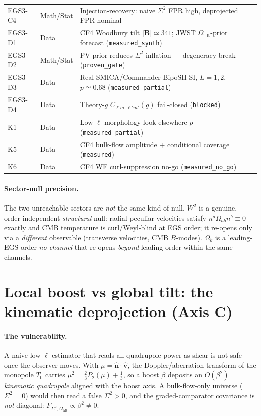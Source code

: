 \documentclass[11pt]{article}
\newcommand{\code}[1]{\texttt{\small #1}}
\newcommand{\Sig}{\Sigma^2}
\newcommand{\Wsq}{W^2}
\newcommand{\Otilt}{\Omega_{\mathrm{tilt}}}
\newcommand{\Ok}{\Omega_{k}}
\begin{document}
\begin{longtable}{@{}lll@{}}
EGS3-C4 & Math/Stat & Injection-recovery: naive $\Sig$ FPR high, deprojected FPR nominal \\
EGS3-D1 & Data & CF4 Woodbury tilt $|\mathbf B|\!\simeq\!341$; JWST $\Otilt$-prior forecast (\code{measured\_synth}) \\
EGS3-D2 & Math/Stat & PV prior reduces $\Sig$ inflation --- degeneracy break (\code{proven\_gate}) \\
EGS3-D3 & Data & Real SMICA/Commander BipoSH SI, $L{=}1,2$, $p\!\simeq\!0.68$ (\code{measured\_partial}) \\
EGS3-D4 & Data & Theory-$g$ $C_{\ell m,\ell'm'}(g)$ fail-closed (\code{blocked}) \\
\midrule
K1 & Data & Low-$\ell$ morphology look-elsewhere $p$ (\code{measured\_partial}) \\
K5 & Data & CF4 bulk-flow amplitude $+$ conditional coverage (\code{measured}) \\
K6 & Data & CF4 WF curl-suppression no-go (\code{measured\_no\_go}) \\
\bottomrule
\end{longtable}

\paragraph{Sector-null precision.} The two unreachable sectors are \emph{not} the
same kind of null. $\Wsq$ is a genuine, order-independent \emph{structural} null:
radial peculiar velocities satisfy $n^a\Omega_{ab}n^b\equiv 0$ exactly and CMB
temperature is curl/Weyl-blind at EGS order; it re-opens only via a
\emph{different} observable (transverse velocities, CMB $B$-modes). $\Ok$ is a
leading-EGS-order \emph{no-channel} that re-opens \emph{beyond} leading order
within the same channels.

\section{Local boost vs global tilt: the kinematic deprojection (Axis C)}
\label{sec:axisc}

\paragraph{The vulnerability.} A naive low-$\ell$ estimator that reads all
quadrupole power as shear is not safe once the observer moves. With
$\mu=\hat{\mathbf n}\!\cdot\!\hat{\mathbf v}$, the Doppler/aberration transform of
the monopole $T_0$ carries $\mu^2=\tfrac23P_2(\mu)+\tfrac13$, so a boost
$\beta$ deposits an $O(\beta^2)$ \emph{kinematic quadrupole} aligned with the
boost axis. A bulk-flow-only universe ($\Sig=0$) would then read a false
$\Sig>0$, and the graded-comparator covariance is \emph{not} diagonal:
$F_{\Sig,\Otilt}\propto\beta^2\neq0$.
\end{document}
